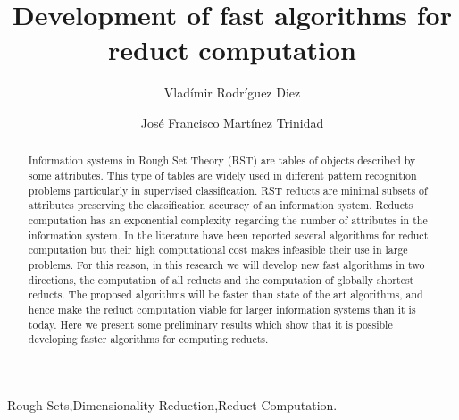 \documentclass[authoryear,11pt]{elsarticle}
\begin{document}
	
	
	\title{Development of fast algorithms for reduct computation}
	
	\author{Vlad\'imir Rodr\'iguez Diez}
	\author{Jos\'e Francisco Mart\'inez Trinidad}
	
	\address{Computer Science Department\\National Institute of
	Astrophysics, Optics and Electronics\\
	Luis Enrique Erro \# 1, Santa Mar\'{\i}a Tonantzintla, Puebla,
	72840, M\'{e}xico} 
	
	
	
	\begin{abstract}
		Information systems in Rough Set Theory (RST) are tables of objects described by some attributes. 
		This type of tables are widely used in different pattern recognition problems particularly in 
		supervised classification. RST reducts are minimal subsets of attributes preserving 
		the classification accuracy of an information system. Reducts computation has an exponential complexity 
		regarding the number of attributes in the information system. In the literature have been reported 
		several algorithms for reduct computation but their high computational cost makes infeasible their
		use in large problems. For this reason, in this research we will develop new fast algorithms 
		in two directions, the computation of all reducts and the computation of globally shortest reducts.
	    The proposed algorithms will be faster than state of the art algorithms, and hence make the reduct 
	    computation viable for larger information systems than it is today. Here we present some preliminary 
	    results which show that it is possible developing faster algorithms for computing reducts.
	\end{abstract}
	
	\begin{keyword}
		Rough Sets\sep Dimensionality Reduction\sep Reduct Computation.
	\end{keyword}

	\maketitle

\pagebreak 
\tableofcontents
\pagebreak 

\end{document}
